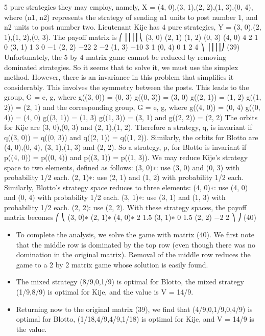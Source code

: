 \documentclass[]{report}
\begin{document}
5 pure strategies they may employ, namely, X = {(4, 0),(3, 1),(2, 2),(1, 3),(0, 4)}, where
(n1, n2) represents the strategy of sending n1 units to post number 1, and n2 units to post
number two. Lieutenant Kije has 4 pure strategies, Y = {(3, 0),(2, 1),(1, 2),(0, 3)}. The
payoff matrix is
⎛
⎜⎜⎜⎜⎝
(3, 0) (2, 1) (1, 2) (0, 3)
(4, 0) 4 2 1 0
(3, 1) 1 3 0 −1
(2, 2) −22 2 −2
(1, 3) −10 3 1
(0, 4) 0 1 2 4
⎞
⎟⎟⎟⎟⎠
(39)
Unfortunately, the 5 by 4 matrix game cannot be reduced by removing dominated
strategies. So it seems that to solve it, we must use the simplex method. However, there is
an invariance in this problem that simplifies it considerably. This involves the symmetry
between the posts. This leads to the group, G = {e, g}, where
g((3, 0)) = (0, 3) g((0, 3)) = (3, 0) g((2, 1)) = (1, 2) g((1, 2)) = (2, 1)
and the corresponding group, G = {e, g}, where
g((4, 0)) = (0, 4) g((0, 4)) = (4, 0) g((3, 1)) = (1, 3) g((1, 3)) = (3, 1)
and g((2, 2)) = (2, 2)
The orbits for Kije are {(3, 0),(0, 3)} and {(2, 1),(1, 2)}. Therefore a strategy, q, is
invariant if q((3, 0)) = q((0, 3)) and q((2, 1)) = q((1, 2)). Similarly, the orbits for Blotto
are {(4, 0),(0, 4)}, {(3, 1),(1, 3)} and {(2, 2)}. So a strategy, p, for Blotto is invariant if
p((4, 0)) = p((0, 4)) and p((3, 1)) = p((1, 3)).
We may reduce Kije’s strategy space to two elements, defined as follows:
(3, 0)∗: use (3, 0) and (0, 3) with probability 1/2 each.
(2, 1)∗: use (2, 1) and (1, 2) with probability 1/2 each.
Similarly, Blotto’s strategy space reduces to three elements:
(4, 0)∗: use (4, 0) and (0, 4) with probability 1/2 each.
(3, 1)∗: use (3, 1) and (1, 3) with probability 1/2 each.
(2, 2): use (2, 2).
With these strategy spaces, the payoff matrix becomes
⎛
⎝
(3, 0)∗ (2, 1)∗
(4, 0)∗ 2 1.5
(3, 1)∗ 0 1.5
(2, 2) −2 2
⎞
⎠ (40)
\begin{itemize}
\itemAs an example of the computations used to arrive at these payoffs, consider the upper
left entry. If Blotto uses (4,0) and (0,4) with probability 1/2 each, and if Kije uses (3,0)
and (0,3) with probability 1/2 each, then the four corners of the matrix (39) occur with
probability 1/4 each, so the expected payoff is the average of the four numbers, 4, 0, 0, 4,
namely 2.
\item To complete the analysis, we solve the game with matrix (40). We first note that
the middle row is dominated by the top row (even though there was no domination in the
original matrix). Removal of the middle row reduces the game to a 2 by 2 matrix game
whose solution is easily found. 
\item The mixed strategy (8/9,0,1/9) is optimal for Blotto, the
mixed strategy (1/9,8/9) is optimal for Kije, and the value is V = 14/9.
\item Returning now to the original matrix (39), we find that (4/9,0,1/9,0,4/9) is optimal
for Blotto, (1/18,4/9,4/9,1/18) is optimal for Kije, and V = 14/9 is the value.
\end{itemize}
\end{document}
